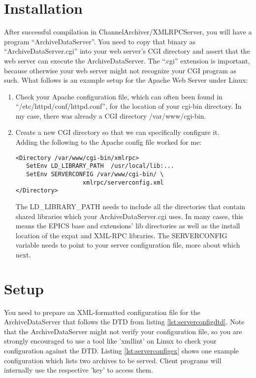 \section{Installation} %
After successful compilation in ChannelArchiver/XMLRPCServer, you will
have a program ``ArchiveDataServer''. You need to copy that binary as
``ArchiveDataServer.cgi'' into your web server's CGI directory and
assert that the web server can execute the ArchiveDataServer.
The ``.cgi'' extension is important, because otherwise your web server
might not recognize your CGI program as such.
What follows is an example setup for the Apache Web Server under Linux:
\begin{enumerate}
\item Check your Apache configuration file, which can often been found
  in ``/etc/httpd/conf/httpd.conf'', for the location of your cgi-bin
  directory.  In my case, there was already a CGI directory /var/www/cgi-bin.

\item Create a new CGI directory so that we can specifically configure
   it.\\
   Adding the following to the Apache config file worked for me:
\begin{lstlisting}[keywordstyle=\sffamily]
<Directory /var/www/cgi-bin/xmlrpc>
   SetEnv LD_LIBRARY_PATH  /usr/local/lib:...
   SetEnv SERVERCONFIG /var/www/cgi-bin/ \
                   xmlrpc/serverconfig.xml
</Directory>
\end{lstlisting}
  The LD\_LIBRARY\_PATH needs to include all the directories that
  contain shared libraries which your ArchiveDataServer.cgi uses.
  In many cases, this means the EPICS base and extensions' lib
  directories as well as the install location of the expat and XML-RPC
  libraries.
  The SERVERCONFIG variable needs to point to your server configuration
   file, more about which next.
\end{enumerate}

\section{Setup}
You need to prepare an XML-formatted configuration file for the
ArchiveDataServer that follows the DTD from listing
\ref{lst:serverconfigdtd}. Note that the ArchiveDataServer might not
verify your configuration file, so you are strongly encouraged to use a
tool like 'xmllint' on Linux to check your configuration against the
DTD. Listing \ref{lst:serverconfigex} shows one example
configuration which lists two archives to be served. Client programs
will internally use the respective 'key' to access them.




